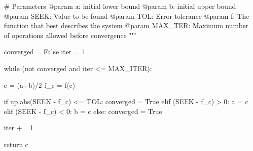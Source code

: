     # Parameters
    @param a: initial lower bound
    @param b: initial upper bound
    @param SEEK: Value to be found
    @param TOL: Error tolerance
    @param f: The function that best describes the system 
    @param MAX_TER: Maximum number of operations allowed before convergence
    """

    converged = False
    iter = 1

    while (not converged and iter <= MAX_ITER):

        c = (a+b)/2
        f_c = f(c)

        if np.abs(SEEK - f_c) <= TOL:
            converged = True
        elif (SEEK - f_c) > 0:
            a = c
        elif (SEEK - f_c) < 0:
            b = c
        else:
            converged = True

        iter += 1

    return c
